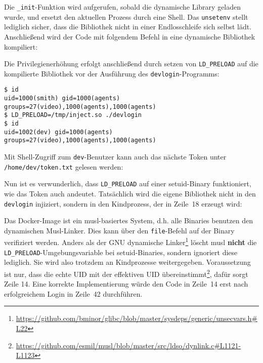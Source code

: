 Die \texttt{\_init}-Funktion wird aufgerufen, sobald die dynamische Library geladen wurde, und ersetzt den aktuellen Prozess durch eine Shell.
Das \texttt{unsetenv} stellt lediglich sicher, dass die Bibliothek nicht in einer Endlosschleife sich selbst lädt.
Anschließend wird der Code mit folgendem Befehl in eine dynamische Bibliothek kompiliert:


Die Privilegienerhöhung erfolgt anschließend durch setzen von \texttt{LD\_PRELOAD} auf die kompilierte Bibliothek vor der Ausführung des \texttt{devlogin}-Programms:
\begin{lstlisting}
$ id
uid=1000(smith) gid=1000(agents) groups=27(video),1000(agents),1000(agents)
$ LD_PRELOAD=/tmp/inject.so ./devlogin
$ id
uid=1002(dev) gid=1000(agents) groups=27(video),1000(agents),1000(agents)
\end{lstlisting}

Mit Shell-Zugriff zum \texttt{dev}-Benutzer kann auch das nächste Token unter \texttt{/home/dev/token.txt} gelesen werden:


Nun ist es verwunderlich, dass \texttt{LD\_PRELOAD} auf einer setuid-Binary funktioniert, wie das Token auch andeutet.
Tatsächlich wird die eigene Bibliothek nicht in den \texttt{devlogin} injiziert, sondern in den Kindprozess, der in Zeile~18 erzeugt wird:

Das Docker-Image ist ein musl-basiertes System, d.h. alle Binaries benutzen den dynamischen Musl-Linker.
Dies kann über den \texttt{file}-Befehl auf der Binary verifiziert werden.
Anders als der GNU dynamische Linker\footnote{\url{https://github.com/bminor/glibc/blob/master/sysdeps/generic/unsecvars.h\#L22}} löscht musl \textbf{nicht} die \texttt{LD\_PRELOAD}-Umgebungsvariable bei setuid-Binaries, sondern ignoriert diese lediglich.
Sie wird also trotzdem an Kindprozesse weitergegeben.
Voraussetzung ist nur, dass die echte UID mit der effektiven UID übereinstimmt\footnote{\url{https://github.com/esmil/musl/blob/master/src/ldso/dynlink.c\#L1121-L1123}}, dafür sorgt Zeile 14.
Eine korrekte Implementierung würde den Code in Zeile~14 erst nach erfolgreichem Login in Zeile~42 durchführen.
